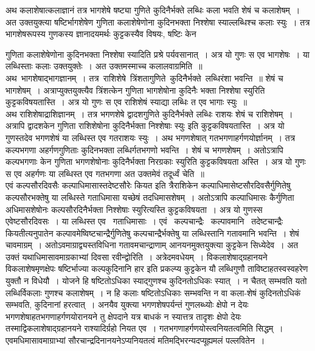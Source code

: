 \documentclass[11pt, openany]{book}
\begin{document}
\vspace{-3mm}
 अथ कलाशेषात्कलाज्ञानं तत्र भागशेषे षष्ट्या गुणिते कुदिनैर्भक्ते 
लब्धिः कला भवति शेषं च कलाशेषम्~। अत उक्तयुक्त्या षष्टिर्भागशेषेण गुणिता कलाशेषेणोना कुदिनभक्ता निश्शेषा स्याल्लब्धिश्च कलाः स्युः~।
तत्र भागशेषरूपस्य गुणकस्य ज्ञानादयमर्थः कुट्टकस्यैव विषयः, षष्टिः केन
 \newpage%

\noindent गुणिता कलाशेषेणोना कुदिनभक्ता निश्शेषा स्यादिति प्रश्रे पर्यवसानात्~। 
अत्र यो गुणः स एव भागशेषः~। या लब्धिस्ताः कलाः उक्तयुक्तेः~। 
अत उक्तमस्माच्च कलालवाग्रमिति~॥~\\

\vspace{-3mm}
 अथ \,भागशेषाद्भागज्ञानम्~। तत्र \,राशिशेषे \,त्रिंशतागुणिते \,कुदिनैर्भक्ते \,लब्धिरंशा भवन्ति~॥ शेषं च भागशेषम्~। अत्राप्युक्तयुक्त्यैव त्रिंशत्केन गुणिता 
भागशेषोना कुदिनैः भक्ता निश्शेषा स्युरिति कुट्टकविषयतास्ति~। अत्र यो 
गुणः स एव राशिशेषं स्याद्या लब्धिः त एव भागाः स्युः~॥~\\

\vspace{-3mm}
 अथ राशिशेषाद्राशिज्ञानम्~। तत्र भगणशेषे द्वादशगुणिते कुदिनैर्भक्ते 
लब्धिः राशयः शेषं च राशिशेषम्~। अत्रापि द्वादशकेन गुणिता राशिशेषोना कुदिनैर्भक्ता निश्शेषाः स्युः इति कुट्टकविषयतास्ति~। अत्र यो गुणस्तदेव 
भगणशेषं या लब्धिस्त एव गतराशयः स्युः~। अथ भगणशेषात् गतभगणाहर्गणयोर्ज्ञानम्~। तत्र कल्पभगणा अहर्गणगुणिताः कुदिनभक्ता लब्धिर्गतभगणो 
भवन्ति~। शेषं च भगणशेषम्~। अतोऽत्रापि कल्पभगणाः केन गुणिता 
भगणशेषोनाः कुदिनैर्भक्ता निरग्रकाः स्युरिति कुट्टकविषयता अस्ति~। अत्र 
यो गुणः स एव अहर्गणः या लब्धिस्त एव गतभगणा अत उक्तमेवं 
तदूर्ध्वं चेति~॥~\\

\vspace{-3mm}
 एवं कल्पसौरदिवसैः कल्पाधिमासास्तदेष्टसौरेः कियत इति त्रैराशिकेन 
कल्पाधिमासेष्टसौरदिवसैर्गुणितेषु कल्पसौरभक्तेषु या लब्धिस्ते गताधिमासा
यच्छेषं तदधिमासशेषम्~। अतोऽत्रापि कल्पाधिमासः कैर्गुणिता अधिमासशेषोनः कल्पसौरदिनैर्भक्ता निश्शेषाः स्युरित्यस्ति कुट्टकविषयता~। अत्र यो
गुणस्स एवेष्टसौरदिवसः~। या लब्धिस्त एव ~गताधिमासाः~। एवं ~कल्पचान्द्रैः ~कल्पावमानि ~तदेष्टचान्द्रैः \;कियतीत्यनुपातेन कल्पावमेष्विष्टचान्द्रैर्गुणितेषु 
कल्पचान्द्रैर्भक्तेषु या लब्धिस्तानि गतावमानि भवन्ति~। शेषं चावमाग्रम्~।
अतोऽवमाग्राद्व्यस्तविधिना गतावमचान्द्राणाम् आनयनमुक्तयुक्त्या कुट्टकेन सिध्येदेव~। 
अत उक्तं यथाधिमासावमाग्रकाभ्यां दिवसा रवीन्द्वोरिति~।
\newpage
 अत्रेदमवधेयम्~। विकलाशेषाद्ग्रहानयने विकलाशेषमृणक्षेपः षष्टिर्भाज्या 
कल्पकुदिनानि हार इति प्रकल्प्य कुट्टकेन यौ लब्धिगुणौ ताविष्टाहतस्वस्वहरेण युक्तौ न विधेयौ~। योजने हि षष्टितोऽधिका स्याद्गुणश्च कुदिनतोऽधिकः 
स्यात्~। न चैतत् सम्भवति यतो लब्धिर्विकलाः गुणश्च कलाशेषम्~। 
न हि कलाः षष्टितोऽधिकाः सम्भवन्ति न वा कला-शेषं कुदिनतोऽधिकं 
सम्भवति, कुदिनानां हरत्वात्~। अनयैव युक्त्या भगणशेषपर्यन्तं गुणलब्ध्योः क्षेपो न देयः भगणशेषाहतभगणाहर्गणयोरानयने तु क्षेपदाने
यत्र बाधकं न स्यात्तत्र तादृशः क्षेपो देयः तस्माद्विकलाशेषाद्ग्रहानयने
राश्यादिर्ग्रहो नियत एव~। गतभगणाहर्गणयोस्त्वनियतत्वमिति सिद्धम्~। एवमधिमासावमाग्राभ्यां सौरचान्द्रदिनानयनेऽप्यनियतत्वं मतिमद्भिरन्यदप्यूह्यमलं
पल्लवितेन~। \\
\end{document}
